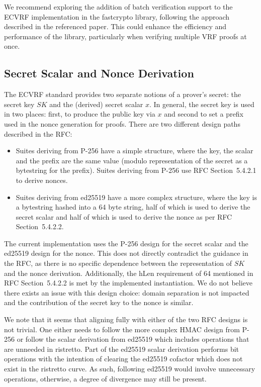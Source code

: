 We recommend exploring the addition of batch verification support to the ECVRF implementation in the fastcrypto library, following the approach described in the referenced paper. This could enhance the efficiency and performance of the library, particularly when verifying multiple VRF proofs at once.

\subsection{Secret Scalar and Nonce Derivation}
The ECVRF standard provides two separate notions of a prover’s secret: the secret key $SK$ and the (derived) secret scalar $x$. In general, the secret key is used in two places: first, to produce the public key via $x$ and second to set a prefix used in the nonce generation for proofs. There are two different design paths described in the RFC:
\begin{itemize}
\item Suites deriving from P-256 have a simple structure, where the key, the scalar and the prefix are the same value (modulo representation of the secret as a bytestring for the prefix). Suites deriving from P-256 use RFC Section~5.4.2.1 to derive nonces.

\item Suites deriving from ed25519 have a more complex structure, where the key is a bytestring hashed into a 64 byte string, half of which is used to derive the secret scalar and half of which is used to derive the nonce as per RFC Section~5.4.2.2.

\end{itemize}
The current implementation uses the P-256 design for the secret scalar and the ed25519 design for the nonce. This does not directly contradict the guidance in the RFC, as there is no specific dependence between the representation of $SK$ and the nonce derivation. Additionally, the hLen requirement of 64 mentioned in RFC Section~5.4.2.2 is met by the implemented instantiation. We do not believe there exists an issue with this design choice: domain separation is not impacted and the contribution of the secret key to the nonce is similar. 

We note that it seems that aligning fully with either of the two RFC designs is not trivial. One either needs to follow the more complex HMAC design from P-256 or follow  the scalar derivation from ed25519 which includes operations that are unneeded in ristretto. Part of the ed25519 scalar derivation performs bit operations with the intention of clearing the ed25519 cofactor which does not exist in the ristretto curve. As such, following ed25519 would involve unnecessary operations, otherwise, a degree of divergence may still be present.

